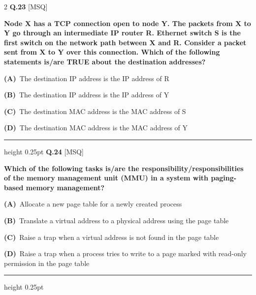 \documentclass[a4paper,10pt,twoside]{article}
\begin{document}
\begin{multicols}{2}
\noindent\textbf{Q.23} \hfill {\footnotesize\textsf{[MSQ]}}
\par\vspace{2pt}
{\bfseries Node X has a TCP connection open to node Y. The packets from X to Y go through an intermediate IP router R. Ethernet switch S is the first switch on the network path between X and R. Consider a packet sent from X to Y over this connection.
Which of the following statements is/are TRUE about the destination addresses? \par}
\par\vspace{2pt}\noindent
\textbf{(A)}~The destination IP address is the IP address of R\par\vspace{2pt}\noindent
\textbf{(B)}~The destination IP address is the IP address of Y\par\vspace{2pt}\noindent
\textbf{(C)}~The destination MAC address is the MAC address of S\par\vspace{2pt}\noindent
\textbf{(D)}~The destination MAC address is the MAC address of Y
\par\vspace{6pt}\hrule height 0.25pt\vspace{6pt}
\noindent\textbf{Q.24} \hfill {\footnotesize\textsf{[MSQ]}}
\par\vspace{2pt}
{\bfseries Which of the following tasks is/are the responsibility/responsibilities of the memory management unit (MMU) in a system with paging-based memory management? \par}
\par\vspace{2pt}\noindent
\textbf{(A)}~Allocate a new page table for a newly created process\par\vspace{2pt}\noindent
\textbf{(B)}~Translate a virtual address to a physical address using the page table\par\vspace{2pt}\noindent
\textbf{(C)}~Raise a trap when a virtual address is not found in the page table\par\vspace{2pt}\noindent
\textbf{(D)}~Raise a trap when a process tries to write to a page marked with read-only permission in the page table
\par\vspace{6pt}\hrule height 0.25pt\vspace{6pt}

\end{multicols}
\end{document}

